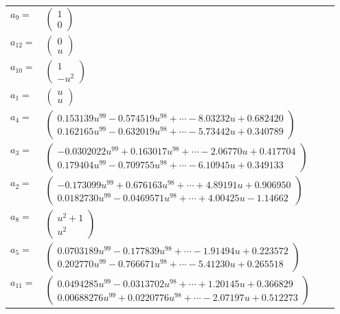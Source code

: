 \documentclass[1p]{elsarticle_modified}
\theoremstyle{definition}
\begin{document}
\begin{tabular}{m{7pt} m{180pt} m{7pt} m{180pt} }
\flushright $a_{9}=$&$\begin{pmatrix}1\\0\end{pmatrix}$ \\
\flushright $a_{12}=$&$\begin{pmatrix}0\\u\end{pmatrix}$ \\
\flushright $a_{10}=$&$\begin{pmatrix}1\\- u^2\end{pmatrix}$ \\
\flushright $a_{1}=$&$\begin{pmatrix}u\\u\end{pmatrix}$ \\
\flushright $a_{4}=$&$\begin{pmatrix}0.153139 u^{99}-0.574519 u^{98}+\cdots-8.03232 u+0.682420\\0.162165 u^{99}-0.632019 u^{98}+\cdots-5.73442 u+0.340789\end{pmatrix}$ \\
\flushright $a_{3}=$&$\begin{pmatrix}-0.0302022 u^{99}+0.163017 u^{98}+\cdots-2.06770 u+0.417704\\0.179404 u^{99}-0.709755 u^{98}+\cdots-6.10945 u+0.349133\end{pmatrix}$ \\
\flushright $a_{2}=$&$\begin{pmatrix}-0.173099 u^{99}+0.676163 u^{98}+\cdots+4.89191 u+0.906950\\0.0182730 u^{99}-0.0469571 u^{98}+\cdots+4.00425 u-1.14662\end{pmatrix}$ \\
\flushright $a_{8}=$&$\begin{pmatrix}u^2+1\\u^2\end{pmatrix}$ \\
\flushright $a_{5}=$&$\begin{pmatrix}0.0703189 u^{99}-0.177839 u^{98}+\cdots-1.91494 u+0.223572\\0.202770 u^{99}-0.766671 u^{98}+\cdots-5.41230 u+0.265518\end{pmatrix}$ \\
\flushright $a_{11}=$&$\begin{pmatrix}0.0494285 u^{99}-0.0313702 u^{98}+\cdots+1.20145 u+0.366829\\0.00688276 u^{99}+0.0220776 u^{98}+\cdots-2.07197 u+0.512273\end{pmatrix}$ \\

\end{tabular}
\end{document}
